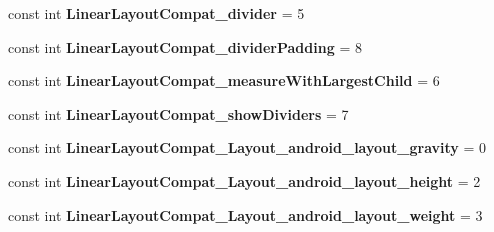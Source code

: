 \begin{DoxyCompactItemize}
\item 
\mbox{\label{class_pinned_app_1_1_droid_1_1_resource_1_1_styleable_a869d853947bed6e8e8f5e3a1b226fd12}} 
const int {\bfseries Linear\+Layout\+Compat\+\_\+divider} = 5
\item 
\mbox{\label{class_pinned_app_1_1_droid_1_1_resource_1_1_styleable_ae790673537500c4aae4114510b0b1ea3}} 
const int {\bfseries Linear\+Layout\+Compat\+\_\+divider\+Padding} = 8
\item 
\mbox{\label{class_pinned_app_1_1_droid_1_1_resource_1_1_styleable_a4f95f42d9340f41e82d1dff182984de4}} 
const int {\bfseries Linear\+Layout\+Compat\+\_\+measure\+With\+Largest\+Child} = 6
\item 
\mbox{\label{class_pinned_app_1_1_droid_1_1_resource_1_1_styleable_ac06f17c1eea4158150d5a1a094bf4727}} 
const int {\bfseries Linear\+Layout\+Compat\+\_\+show\+Dividers} = 7
\item 
\mbox{\label{class_pinned_app_1_1_droid_1_1_resource_1_1_styleable_a9c2d6e5f35960eb0e78ea757b17fdded}} 
const int {\bfseries Linear\+Layout\+Compat\+\_\+\+Layout\+\_\+android\+\_\+layout\+\_\+gravity} = 0
\item 
\mbox{\label{class_pinned_app_1_1_droid_1_1_resource_1_1_styleable_a97fb5492158304f9febbecce19128aaf}} 
const int {\bfseries Linear\+Layout\+Compat\+\_\+\+Layout\+\_\+android\+\_\+layout\+\_\+height} = 2
\item 
\mbox{\label{class_pinned_app_1_1_droid_1_1_resource_1_1_styleable_ae189048180dcc65f7175dfbde65ffa5f}} 
const int {\bfseries Linear\+Layout\+Compat\+\_\+\+Layout\+\_\+android\+\_\+layout\+\_\+weight} = 3
\item 
\mbox{\label{class_pinned_app_1_1_droid_1_1_resource_1_1_styleable_a3f7e9c02b296efaeb9a89fbc7f70dda7}} 

\end{DoxyCompactItemize}
